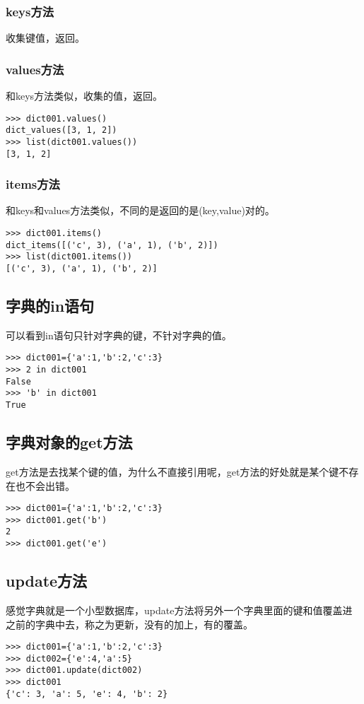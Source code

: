\documentclass[12pt,oneside]{book}
\begin{document}
\begin{common-format}
\subsubsection{keys方法}
收集键值，返回。

\subsubsection{values方法}
和keys方法类似，收集的值，返回。
\begin{Verbatim}
>>> dict001.values()
dict_values([3, 1, 2])
>>> list(dict001.values())
[3, 1, 2]
\end{Verbatim}

\subsubsection{items方法}
和keys和values方法类似，不同的是返回的是(key,value)对的。
\begin{Verbatim}
>>> dict001.items()
dict_items([('c', 3), ('a', 1), ('b', 2)])
>>> list(dict001.items())
[('c', 3), ('a', 1), ('b', 2)]
\end{Verbatim}



\subsection{字典的in语句}
可以看到in语句只针对字典的键，不针对字典的值。
\begin{Verbatim}
>>> dict001={'a':1,'b':2,'c':3}
>>> 2 in dict001
False
>>> 'b' in dict001
True
\end{Verbatim}

\subsection{字典对象的get方法}
get方法是去找某个键的值，为什么不直接引用呢，get方法的好处就是某个键不存在也不会出错。
\begin{Verbatim}
>>> dict001={'a':1,'b':2,'c':3}
>>> dict001.get('b')
2
>>> dict001.get('e')
\end{Verbatim}

\subsection{update方法}
感觉字典就是一个小型数据库，update方法将另外一个字典里面的键和值覆盖进之前的字典中去，称之为更新，没有的加上，有的覆盖。
\begin{Verbatim}
>>> dict001={'a':1,'b':2,'c':3}
>>> dict002={'e':4,'a':5}
>>> dict001.update(dict002)
>>> dict001
{'c': 3, 'a': 5, 'e': 4, 'b': 2}
\end{Verbatim}


\end{common-format}
\end{document}
